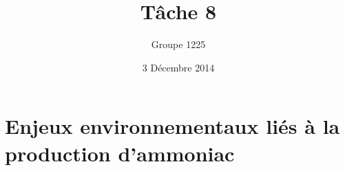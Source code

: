 \documentclass[a4paper, oneside, 12pt]{article}
\title{Tâche 8}
\author{Groupe 1225}
\date{3 Décembre 2014}
\begin{document}
\maketitle

\chapter{Enjeux environnementaux liés à la production d'ammoniac}
\end{document}
